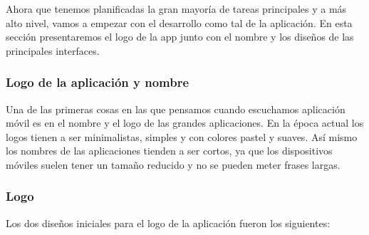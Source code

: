 Ahora que tenemos planificadas la gran mayoría de tareas principales y a más alto nivel, vamos a empezar con el desarrollo como tal de la aplicación. En esta sección presentaremos el logo de la app junto con el nombre y los diseños de las principales interfaces. 

\subsubsection{Logo de la aplicación y nombre}

Una de las primeras cosas en las que pensamos cuando escuchamos aplicación móvil es en el nombre y el logo de las grandes aplicaciones. En la época actual los logos tienen a ser minimalistas, simples y con colores pastel y suaves. Así mismo los nombres de las aplicaciones tienden a ser cortos, ya que los dispositivos móviles suelen tener un tamaño reducido y no se pueden meter frases largas. 

\subsubsection*{Logo}

Los dos diseños iniciales para el logo de la aplicación fueron los siguientes: 

